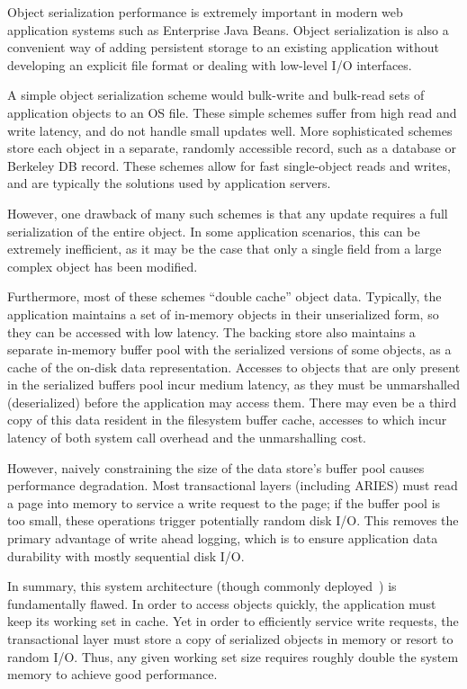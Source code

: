 \documentclass[10pt,letterpaper,twocolumn,english]{article}
\begin{document}
Object serialization performance is extremely important in modern web
application systems such as Enterprise Java Beans.  Object
serialization is also a convenient way of adding persistent storage to
an existing application without developing an explicit file format or
dealing with low-level I/O interfaces.

A simple object serialization scheme would bulk-write and bulk-read
sets of application objects to an OS file.  These simple
schemes suffer from high read and write latency, and do not handle
small updates well.  More sophisticated schemes store each object in a
separate, randomly accessible record, such as a database  or
 Berkeley DB record.  These schemes allow for fast single-object reads and writes, and are typically the solutions used by
application servers.

However, one drawback of many such schemes is that any update requires
a full serialization of the entire object. In some application
scenarios, this can be extremely inefficient, as it may be the case
that only a single field from a large complex object has been
modified.

Furthermore, most of these schemes ``double cache'' object
data.  Typically, the application maintains a set of in-memory
objects in their unserialized form, so they can be accessed with low latency.
The backing store also
maintains a separate in-memory buffer pool with the serialized versions of
some objects, as a cache of the on-disk data representation.
Accesses to objects that are only present in the serialized buffers
pool incur medium latency, as they must be unmarshalled (deserialized)
before the application may access them.  
There may even be a third copy of this data resident in the filesystem 
buffer cache, accesses to which incur latency of both system call overhead and
the unmarshalling cost.

However, naively constraining the size of the data store's buffer pool
causes performance degradation. Most transactional layers 
(including ARIES) must read a page
into memory to service a write request to the page; if the buffer pool
is too small, these operations trigger potentially random disk I/O. 
This removes the primary
advantage of write ahead logging, which is to ensure application data
durability with mostly sequential disk I/O.

In summary, this system architecture (though commonly
deployed~\cite{ejb,ordbms,jdo,...}) is fundamentally
flawed.  In order to access objects quickly, the application must keep
its working set in cache.  Yet in order to efficiently service write 
requests, the
transactional layer must store a copy of serialized objects
in memory or resort to random I/O.  
Thus, any given working set size requires roughly double the system
memory to achieve good performance.
\end{document}
